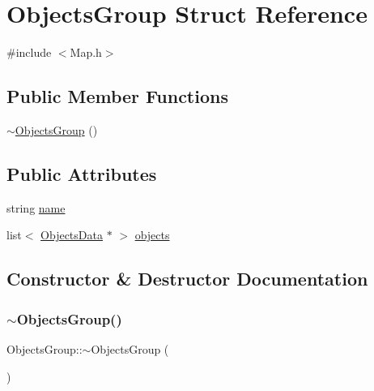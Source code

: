 \hypertarget{struct_objects_group}{}\section{Objects\+Group Struct Reference}
\label{struct_objects_group}


{\ttfamily \#include $<$Map.\+h$>$}

\subsection*{Public Member Functions}
\begin{DoxyCompactItemize}
\item 
\mbox{\hyperlink{struct_objects_group_a310c3707c2097bdd7821b56f2cc6257d}{$\sim$\+Objects\+Group}} ()
\end{DoxyCompactItemize}
\subsection*{Public Attributes}
\begin{DoxyCompactItemize}
\item 
string \mbox{\hyperlink{struct_objects_group_aa9da9d1a7a6bd76a43fc89e58fc1d9ef}{name}}
\item 
list$<$ \mbox{\hyperlink{struct_objects_data}{Objects\+Data}} $\ast$ $>$ \mbox{\hyperlink{struct_objects_group_a6ec387c4f7bc0c04b5fed66a96cd8765}{objects}}
\end{DoxyCompactItemize}


\subsection{Constructor \& Destructor Documentation}
\mbox{\label{struct_objects_group_a310c3707c2097bdd7821b56f2cc6257d}} 
\subsubsection{\texorpdfstring{$\sim$ObjectsGroup()}{~ObjectsGroup()}}
{\footnotesize\ttfamily Objects\+Group\+::$\sim$\+Objects\+Group (\begin{DoxyParamCaption}{ }\end{DoxyParamCaption})\hspace{0.3cm}{\ttfamily [inline]}}



